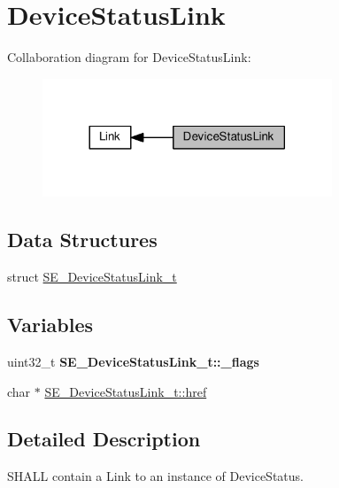 \hypertarget{group__DeviceStatusLink}{}\section{Device\+Status\+Link}
\label{group__DeviceStatusLink}
Collaboration diagram for Device\+Status\+Link\+:\nopagebreak
\begin{figure}[H]
\begin{center}
\leavevmode
\includegraphics[width=245pt]{group__DeviceStatusLink}
\end{center}
\end{figure}
\subsection*{Data Structures}
\begin{DoxyCompactItemize}
\item 
struct \hyperlink{structSE__DeviceStatusLink__t}{S\+E\+\_\+\+Device\+Status\+Link\+\_\+t}
\end{DoxyCompactItemize}
\subsection*{Variables}
\begin{DoxyCompactItemize}
\item 
\mbox{\label{group__DeviceStatusLink_gaf729f3f566304ec1d508158449ab02b1}} 
uint32\+\_\+t {\bfseries S\+E\+\_\+\+Device\+Status\+Link\+\_\+t\+::\+\_\+flags}
\item 
char $\ast$ \hyperlink{group__DeviceStatusLink_ga22a45171b095064aa3aa29c717a11915}{S\+E\+\_\+\+Device\+Status\+Link\+\_\+t\+::href}
\end{DoxyCompactItemize}


\subsection{Detailed Description}
S\+H\+A\+LL contain a Link to an instance of Device\+Status. 


